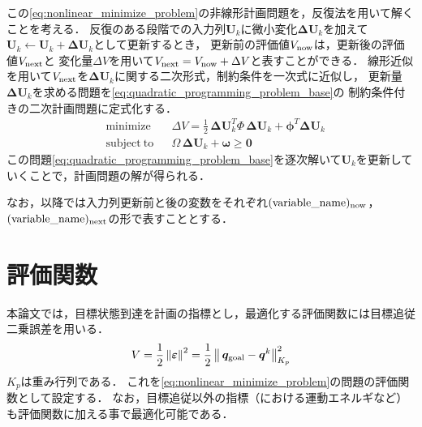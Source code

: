 \documentclass[autodetect-engine,dvipdfmx-if-dvi,ja=standard,a4j,jbase=11pt,magstyle=nomag*]{bxjsreport}
\begin{document}
この\cref{eq:nonlinear_minimize_problem}の非線形計画問題を，反復法を用いて解くことを考える．
反復のある段階での入力列$\bm{U}_k$に微小変化$\bm{\Delta U}_k$を加えて$\bm{U}_k \gets \bm{U}_k + \bm{\Delta U}_k$として更新するとき，
更新前の評価値$V_{\mathrm{now}}$は，更新後の評価値$V_{\mathrm{next}}$と
変化量$\Delta V$を用いて$V_{\mathrm{next}} = V_{\mathrm{now}} + \Delta V$と表すことができる．
線形近似を用いて$V_{\mathrm{next}}$を$\bm{\Delta U}_k$に関する二次形式，制約条件を一次式に近似し，
更新量$\bm{\Delta U}_k$を求める問題を\cref{eq:quadratic_programming_problem_base}の
制約条件付きの二次計画問題に定式化する．
\begin{equation} \label{eq:quadratic_programming_problem_base}
    \begin{aligned}
        & \mathrm{minimize} && \Delta V = \frac{1}{2} \, \bm{\Delta U}_k^T \varPhi \, \bm{\Delta U}_k + \bm{\phi}^T \bm{\Delta U}_k \\
        & \mathrm{subject~to} && \varOmega \, \bm{\Delta U}_k + \bm{\omega} \geq \bm{0}
    \end{aligned}
\end{equation}
この問題\cref{eq:quadratic_programming_problem_base}を逐次解いて$\bm{U}_k$を更新していくことで，計画問題の解が得られる．

なお，以降では入力列更新前と後の変数をそれぞれ$(\mathrm{variable\_name})_{\mathrm{now}}$，$(\mathrm{variable\_name})_{\mathrm{next}}$の形で表すこととする．


\section{評価関数}
本論文では，目標状態到達を計画の指標とし，最適化する評価関数には目標追従二乗誤差を用いる．
\begin{equation} \label{eq:evaluation_function}
    V = \frac{1}{2} \, {\left\| \bm{\varepsilon} \right\|}^2 = \frac{1}{2} \, {\left\| \, \bm{q}_{\mathrm{goal}} - \bm{q}^k \right\|}^2_{K_p}
\end{equation}
$K_p$は重み行列である．
これを\cref{eq:nonlinear_minimize_problem}の問題の評価関数として設定する．
なお，目標追従以外の指標（\cite{yao_2010iros, yao_2011rs}における運動エネルギなど）も評価関数に加える事で最適化可能である．
\end{document}
